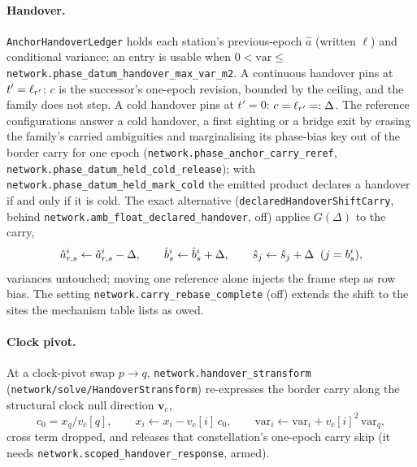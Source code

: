 \documentclass[main.tex]{subfiles}
\begin{document}
\paragraph{Handover.}
\texttt{AnchorHandoverLedger} holds each station's previous-epoch $\hat a$
(written $\ell$) and conditional variance; an entry is usable when
$0 < \mathrm{var} \le$
\texttt{network.phase\_datum\_handover\_max\_var\_m2}. A continuous handover
pins at $t' = \ell_{r'}$: $c$ is the successor's one-epoch revision,
bounded by the ceiling, and the family does not step. A cold handover pins
at $t' = 0$: $c = \ell_{r'} =: \Delta$. The reference configurations
answer a cold handover, a first sighting or a bridge exit by erasing the
family's carried ambiguities and marginalising its phase-bias key out of the
border carry for one epoch (\texttt{network.phase\_anchor\_carry\_reref},
\texttt{network.phase\_datum\_held\_cold\_release}); with
\texttt{network.phase\_datum\_held\_mark\_cold} the emitted product declares
a handover if and only if it is cold. The exact alternative
(\texttt{declaredHandoverShiftCarry}, behind
\texttt{network.amb\_float\_declared\_handover}, off) applies $G(\Delta)$ to
the carry,
\begin{equation}
\hat a^{i}_{r,s} \leftarrow \hat a^{i}_{r,s} - \Delta,
\qquad
\hat b^{i}_s \leftarrow \hat b^{i}_s + \Delta,
\qquad
\hat s_j \leftarrow \hat s_j + \Delta \;\;(j = b^{i}_s),
\label{eq:veh-declared}
\end{equation}
variances untouched; moving one reference alone injects the frame step as
row bias. The setting \texttt{network.carry\_rebase\_complete} (off) extends
the shift to the sites the mechanism table lists as owed.

\paragraph{Clock pivot.}
At a clock-pivot swap $p \to q$, \texttt{network.handover\_stransform}
(\texttt{network/solve/HandoverStransform}) re-expresses the border carry
along the structural clock null direction $\bm{v}_c$,
\begin{equation}
c_0 = x_q/v_c[q],
\qquad
x_i \leftarrow x_i - v_c[i]\,c_0,
\qquad
\mathrm{var}_i \leftarrow \mathrm{var}_i + v_c[i]^2\,\mathrm{var}_q ,
\label{eq:veh-clockst}
\end{equation}
cross term dropped, and releases that constellation's one-epoch carry skip
(it needs \texttt{network.scoped\_handover\_response}, armed).
\end{document}
